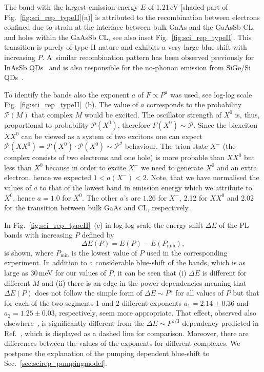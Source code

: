 The band with the largest emission energy $E$ of 1.21$\,$eV [shaded part of Fig.~\ref{fig:sci_rep_typeII}(a)] is attributed to the recombination between electrons confined due to strain at the interface between bulk GaAs and the GaAsSb CL, and holes within the GaAsSb CL, see also inset Fig.~\ref{fig:sci_rep_typeII}. This transition is purely of type-II nature and exhibits a very large blue-shift with increasing $P$. A~similar recombination pattern has been observed previously for InAsSb QDs~\cite{Mazur2012} and is also responsible for the no-phonon emission from SiGe/Si QDs~\cite{SiGeKlenovsky}. 

To identify the bands also the exponent $a$ of $F\propto P^a$ was used, see log-log scale Fig.~\ref{fig:sci_rep_typeII}~(b). The value of $a$ corresponds to the probability $\mathcal{P}(M)$ that complex $M$ would be excited. The oscillator strength of $X^0$ is, thus, proportional to probability $\mathcal{P}(X^0)$, therefore $F(X^0)\sim \mathcal{P}$. Since the biexciton $XX^0$ can be viewed as a system of two excitons one can expect $\mathcal{P}(XX^0)=\mathcal{P}(X^0)\cdot \mathcal{P}(X^0)\sim \mathcal{P}^2$ behaviour. The trion state $X^-$ (the complex consists of two electrons and one hole) is more probable than $XX^0$ but less than $X^0$ because in order to excite $X^-$ we need to generate $X^0$ and an extra electron, hence we expected $1<a(X^-)<2$. Note, that we have normalised the values of $a$ to that of the lowest band in emission energy which we attribute to $X^0$, hence $a=1.0$ for $X^0$. The other $a$'s are $1.26$ for $X^-$, 2.12 for $XX^0$ and 2.02 for the transition between bulk GaAs and CL, respectively.


In Fig.~\ref{fig:sci_rep_typeII}~(c) in log-log scale the energy shift $\Delta E$ of the PL bands with increasing $P$ defined by
\begin{equation}
\Delta E(P)= E(P) - E(P_\mathrm{min}),
\end{equation}
is shown, where $P_\mathrm{min}$ is the lowest value of $P$ used in the corresponding experiment. In addition to a considerable blue-shift of the bands, which is as large as 30$\,$meV for our values of $P$, it can be seen that (i) $\Delta E$ is different for different $M$ and (ii) there is an edge in the power dependencies meaning that $\Delta E(P)$ 
does not follow the simple form of $\Delta E\sim P^a$ for all values of $P$ but that for each of the two segments 1 and 2 different exponents $a_1=2.14\pm0.36$ and $a_2=1.25\pm0.03$, respectively, seem more appropriate. That effect, observed also elsewhere~\citep{Muller-Kirsch2001}, is significantly different from the $\Delta E\sim P^{1/3}$ dependency predicted in Ref.~\citep{Hatami1998}, which is displayed as a dashed line for comparison.
Moreover, there are differences between the values of the exponents for different complexes. We postpone the explanation of the pumping dependent blue-shift to Sec.~\ref{sec:scirep_pumpingmodel}.


